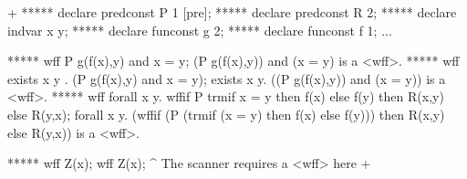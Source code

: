 



\label{language-examples}
\gfexample+
   ***** declare predconst P 1 [pre];
   ***** declare predconst R 2;
   ***** declare indvar x y;
   ***** declare funconst g 2;
   ***** declare funconst f 1;
   ...

   ***** wff P g(f(x),y) and x = y;
   (P g(f(x),y)) and (x = y) is a <wff>.
   ***** wff exists x y . (P g(f(x),y) and x = y);
   exists x y. ((P g(f(x),y)) and (x = y)) is a <wff>.
   ***** wff forall x y. wffif P trmif x = y then f(x) else f(y)
                then R(x,y)
                else R(y,x);
   forall x y. (wffif (P (trmif (x = y) then f(x) else f(y))) then R(x,y) else
   R(y,x)) is a <wff>.

   ***** wff Z(x);
   wff Z(x);
       ^
   The scanner requires a <wff> here
+

